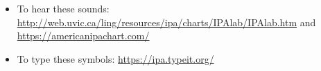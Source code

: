 \begin{itemize}
  \item To hear these sounds: \url{http://web.uvic.ca/ling/resources/ipa/charts/IPAlab/IPAlab.htm} and \url{https://americanipachart.com/}
  \item To type these symbols: \url{https://ipa.typeit.org/}
\end{itemize}
